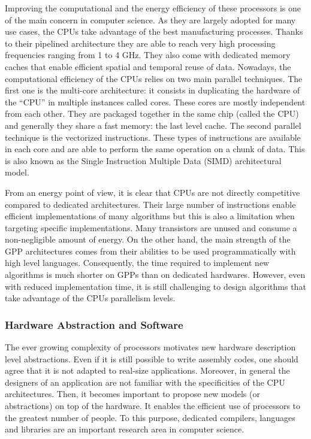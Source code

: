 Improving the computational and the energy efficiency of these processors is one
of the main concern in computer science. As they are largely adopted for many
use cases, the CPUs take advantage of the best manufacturing processes. Thanks
to their pipelined architecture they are able to reach very high processing
frequencies ranging from 1 to 4 GHz. They also come with dedicated memory caches
that enable efficient spatial and temporal reuse of data.
Nowadays, the computational efficiency of the CPUs relies on two main parallel
techniques. The first one is the multi-core architecture: it consists in
duplicating the hardware of the ``CPU'' in multiple instances called cores.
These cores are mostly independent from each other. They are packaged together
in the same chip (called the CPU) and generally they share a fast memory: the
last level cache. The second parallel technique is the vectorized instructions.
These types of instructions are available in each core and are able to perform
the same operation on a chunk of data. This is also known as the Single
Instruction Multiple Data (SIMD) architectural model.

From an energy point of view, it is clear that CPUs are not directly competitive
compared to dedicated architectures. Their large number of instructions enable
efficient implementations of many algorithms but this is also a limitation when
targeting specific implementations. Many transistors are unused and consume a
non-negligible amount of energy. On the other hand, the main strength of the GPP
architectures comes from their abilities to be used programmatically with high
level languages. Consequently, the time required to implement new algorithms is
much shorter on GPPs than on dedicated hardwares. However, even with reduced
implementation time, it is still challenging to design algorithms that take
advantage of the CPUs parallelism levels.

\subsubsection*{Hardware Abstraction and Software}

The ever growing complexity of processors motivates new hardware description
level abstractions. Even if it is still possible to write assembly codes, one
should agree that it is not adapted to real-size applications. Moreover, in
general the designers of an application are not familiar with the specificities
of the CPU architectures. Then, it becomes important to propose new models (or
abstractions) on top of the hardware. It enables the efficient use of processors
to the greatest number of people. To this purpose, dedicated compilers,
languages and libraries are an important research area in computer science.

